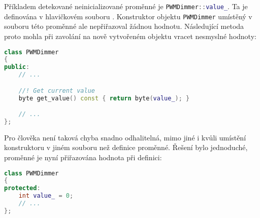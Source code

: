 Příkladem detekované neinicializované proměnné je
\lstinline[language=C++]!PWMDimmer::value_!. Ta je definována v hlavičkovém
souboru . Konstruktor objektu
\texttt{PWMDimmer} umístěný v souboru 
této proměnné ale nepřiřazoval žádnou hodnotu. Následující metoda proto mohla
při zavolání na nově vytvořeném objektu vracet nesmyslné hodnoty:
\begin{lstlisting}[language=C++]
class PWMDimmer
{
public:
    // ...

    //! Get current value
    byte get_value() const { return byte(value_); }

    // ...
};
\end{lstlisting}
Pro člověka není taková chyba snadno odhalitelná, mimo jiné i kvůli umístění
konstruktoru v jiném souboru než definice proměnné.
Řešení bylo jednoduché, proměnné je nyní přiřazována hodnota při definici:
\begin{lstlisting}[language=C++]
class PWMDimmer
{
protected:
    int value_ = 0;
    // ...
};
\end{lstlisting}
